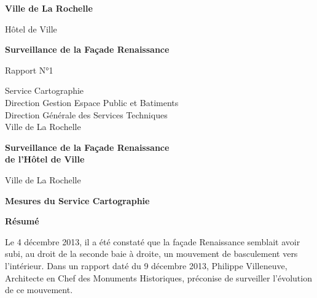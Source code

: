\documentclass[french]{article}
\begin{document}
\graphicspath{{images/}{~/}{~/f/CARTOGRAPHIE/Plans/2_Topo_EnCours/hotel_de_ville/20131210/Station\ 1/Points\ cible\ S1/}}




\begin{titlepage}
  \begin{center}
    \vspace*{1cm}

    \Huge
    \textbf{Ville de La Rochelle}

    \vspace{0.5cm}
    \LARGE
    Hôtel de Ville

    \vspace{1.5cm}

    \textbf{Surveillance de la Façade Renaissance}

    \vfill

    Rapport N°1

    \vspace{0.8cm}


    \Large
    Service Cartographie\\
    Direction Gestion Espace Public et Batiments\\
    Direction Générale des Services Techniques\\
    Ville de La Rochelle\\
    \date{-}

  \end{center}
\end{titlepage}

\thispagestyle{plain}
\begin{center}
  \Large
  \textbf{Surveillance de la Façade Renaissance\\de l'Hôtel de Ville}

  \vspace{0.4cm}
  \large
  Ville de La Rochelle

  \vspace{0.4cm}
  \textbf{Mesures du Service Cartographie}

  \vspace{0.9cm}
  \textbf{Résumé}
\end{center}

Le 4 décembre 2013, il a été constaté que la façade Renaissance semblait avoir subi, 
au droit de la seconde baie à droite, un mouvement de basculement vers l'intérieur.
Dans un rapport daté du 9 décembre 2013, Philippe Villeneuve, Architecte en Chef des 
Monuments Historiques, préconise de surveiller l'évolution de ce mouvement.
\end{document}
